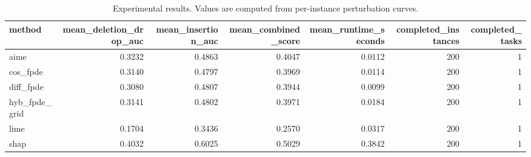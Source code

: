 \begin{table}[t]
\caption{Experimental results. Values are computed from per-instance perturbation curves.}
\label{tab:main_results_computed}
\centering
\begin{tabular}{lrrrrrr}
\toprule
method & mean\_deletion\_drop\_auc & mean\_insertion\_auc & mean\_combined\_score & mean\_runtime\_seconds & completed\_instances & completed\_tasks \\
\midrule
aime & 0.3232 & 0.4863 & 0.4047 & 0.0112 & 200 & 1 \\
cos\_fpde & 0.3140 & 0.4797 & 0.3969 & 0.0114 & 200 & 1 \\
diff\_fpde & 0.3080 & 0.4807 & 0.3944 & 0.0099 & 200 & 1 \\
hyb\_fpde\_grid & 0.3141 & 0.4802 & 0.3971 & 0.0184 & 200 & 1 \\
lime & 0.1704 & 0.3436 & 0.2570 & 0.0317 & 200 & 1 \\
shap & 0.4032 & 0.6025 & 0.5029 & 0.3842 & 200 & 1 \\
\bottomrule
\end{tabular}

\end{table}
